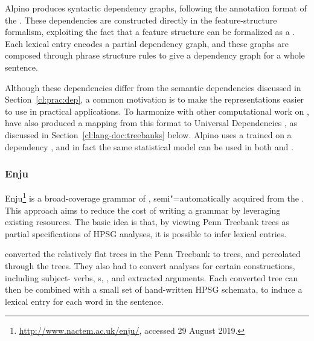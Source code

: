 \documentclass[output=paper,biblatex,babelshorthands,newtxmath,draftmode,colorlinks,citecolor=brown]{langscibook}
\begin{document}
Alpino produces syntactic dependency graphs,
following the annotation format of the  \citep{oostdijk2000corpus}.
These dependencies are constructed directly in the feature-structure formalism,
exploiting the fact that a feature structure can be formalized as a .
Each lexical entry encodes a partial dependency graph,
and these graphs are composed through phrase structure rules
to give a dependency graph for a whole sentence.

Although these dependencies differ from the semantic dependencies discussed in Section~\ref{cl:prac:dep},
a common motivation is to make the representations easier to use in practical applications.
To harmonize with other computational work on ,
\citet{Bou:Van:17} have also produced a mapping from this format
to Universal Dependencies \citep[UD;][]{Niv:Mar:Gin:16},
as discussed in Section~\ref{cl:lang-doc:treebanks} below.
Alpino uses a  trained on a dependency ,
and in fact the same statistical model can be used in both  and 
\citep{dekok2011reversible}.

\subsubsection{Enju}
\label{cl:other:enju}

%
Enju\footnote{%
	\url{http://www.nactem.ac.uk/enju/}, accessed 29 August 2019.
} \citep{MNT2005a-u}
is a broad-coverage grammar of ,
semi"=automatically acquired from the  \citep{Mar:San:Mar:93}.
This approach aims to reduce the cost of writing a grammar
by leveraging existing resources.
The basic idea is that, by viewing Penn Treebank trees as partial specifications of HPSG analyses,
it is possible to infer lexical entries.

\citeauthor{MNT2005a-u} converted the relatively flat trees in the Penn Treebank to  trees,
and percolated  through the trees.
They also had to convert analyses for certain constructions,
including subject- verbs, s, , and extracted arguments.
Each converted tree can then be combined with a small set of hand-written HPSG schemata,
to induce a lexical entry for each word in the sentence.
\end{document}

